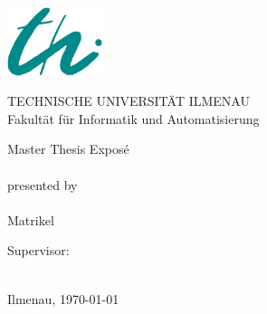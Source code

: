 \begin{titlepage}

\begin{center}
\includegraphics[height=2cm]{pics/logo-thi.jpg}
\vspace{1cm}

TECHNISCHE UNIVERSITÄT ILMENAU\\
Fakultät für Informatik und Automatisierung

\vspace{4cm}

{\large  Master Thesis Exposé} \\ 
\vspace{1cm}
{\LARGE \normalfont \bfseries \sathema} \\
\vspace{1cm}
{presented by} \\
\vspace{0.5cm}
{\large \saauthor}\\
{Matrikel \matrikel}
\vspace{2cm}

Supervisor: \\
\vspace{0.5cm}
\saprof \\
\saproff

\vspace{1cm}

Ilmenau, \today
\end{center}

\end{titlepage}
